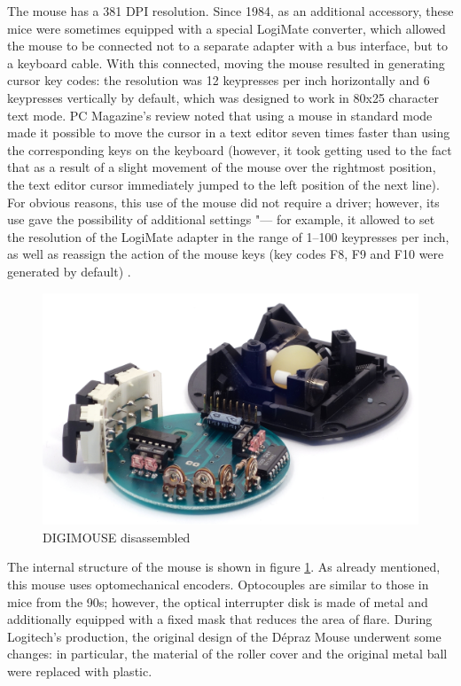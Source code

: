 \documentclass[11pt, a4paper]{article}
\begin{document}
The mouse has a 381 DPI resolution. Since 1984, as an additional accessory, these mice were sometimes equipped with a special LogiMate \cite{oldmouse} converter, which allowed the mouse to be connected not to a separate adapter with a bus interface, but to a keyboard cable. With this connected, moving the mouse resulted in generating cursor key codes:  the resolution was 12 keypresses per inch horizontally and 6 keypresses vertically by default, which was designed to work in 80x25 character text mode. PC Magazine's review noted that using a mouse in standard mode made it possible to move the cursor in a text editor seven times faster than using the corresponding keys on the keyboard (however, it took getting used to the fact that as a result of a slight movement of the mouse over the rightmost position, the text editor cursor immediately jumped to the left position of the next line). For obvious reasons, this use of the mouse did not require a driver; however, its use gave the possibility of additional settings "--- for example, it allowed to set the resolution of the LogiMate adapter in the range of 1--100 keypresses per inch, as well as reassign the action of the mouse keys (key codes F8, F9 and F10 were generated by default) \cite{DIGIMOUSE}.

 \begin{figure}[h]
    \centering
    \includegraphics[scale=0.7]{1982_depraz_digimouse/inside_60.jpg}
    \caption{DIGIMOUSE disassembled}
    \label{fig:DIGIMOUSEP4Inside}
\end{figure}

The internal structure of the mouse is shown in figure \ref{fig:DIGIMOUSEP4Inside}. As already mentioned, this mouse uses optomechanical encoders. Optocouples are similar to those in mice from the 90s; however, the optical interrupter disk is made of metal and additionally equipped with a fixed mask that reduces the area of flare. During Logitech's production, the original design of the Dépraz Mouse underwent some changes: in particular, the material of the roller cover and the original metal ball \cite{oldmouse} were replaced with plastic.
\end{document}
